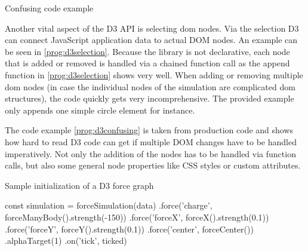 \begin{program}
\caption{Confusing code example}
\label{prog:d3confusing}
\end{program}

Another vital aspect of the D3 API is selecting dom nodes. Via the selection D3 can connect JavaScript application data to actual DOM nodes. An example can be seen in \ref{prog:d3selection}. Because the library is not declarative, each node that is added or removed is handled via a chained function call as the append function in  \ref{prog:d3selection} shows very well. When adding or removing multiple dom nodes (in case the individual nodes of the simulation are complicated dom structures), the code quickly gets very incomprehensive. The provided example only appends one simple circle element for instance. 

The code example \ref{prog:d3confusing} is taken from production code and shows how hard to read D3 code can get if multiple DOM changes have to be handled imperatively. Not only the addition of the nodes has to be handled via function calls, but also some general node properties like CSS styles or custom attributes.

\begin{program}
\caption{Sample initialization of a D3 force graph}
\label{prog:d3forceinit}
\begin{JsCode}
const simulation = forceSimulation(data)
  .force('charge', forceManyBody().strength(-150))
  .force('forceX', forceX().strength(0.1))
  .force('forceY', forceY().strength(0.1))
  .force('center', forceCenter())
  .alphaTarget(1)
  .on('tick', ticked)
\end{JsCode}
\end{program}

